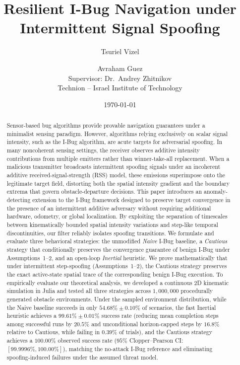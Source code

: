 \documentclass[12pt, a4paper]{article}
\title{Resilient I-Bug Navigation under Intermittent Signal Spoofing}
\author{
  Tsuriel Vizel \and Avraham Guez \\[1ex]
  \small Supervisor: Dr.\ Andrey Zhitnikov \\
  \small Technion -- Israel Institute of Technology
}
\date{\today}
\begin{document}
\maketitle

\begin{abstract}
Sensor-based bug algorithms provide provable navigation guarantees under a minimalist sensing paradigm. However, algorithms relying exclusively on scalar signal intensity, such as the I-Bug algorithm, are acute targets for adversarial spoofing. In many noncoherent sensing settings, the receiver observes additive intensity contributions from multiple emitters rather than winner-take-all replacement. When a malicious transmitter broadcasts intermittent spoofing signals under an incoherent additive received-signal-strength (RSS) model, these emissions superimpose onto the legitimate target field, distorting both the spatial intensity gradient and the boundary extrema that govern obstacle-departure decisions. This paper introduces an anomaly-detecting extension to the I-Bug framework designed to preserve target convergence in the presence of an intermittent additive adversary without requiring additional hardware, odometry, or global localization. By exploiting the separation of timescales between kinematically bounded spatial intensity variations and step-like temporal discontinuities, our filter reliably isolates spoofing transitions. We formulate and evaluate three behavioral strategies: the unmodified \textit{Naive} I-Bug baseline, a \textit{Cautious} strategy that conditionally preserves the convergence guarantee of benign I-Bug under Assumptions~1--2, and an open-loop \textit{Inertial} heuristic. We prove mathematically that under intermittent step-spoofing (Assumptions~1--2), the Cautious strategy preserves the exact active-state spatial trace of the corresponding benign I-Bug execution. To empirically evaluate our theoretical analysis, we developed a continuous 2D kinematic simulation in Julia and tested all three strategies across $1,000,000$ procedurally generated obstacle environments. Under the sampled environment distribution, while the Naive baseline succeeds in only $54.68\% \pm 0.10\%$ of scenarios, the fast Inertial heuristic achieves a $99.61\% \pm 0.01\%$ success rate (reducing mean completion steps among successful runs by $20.5\%$ and unconditional horizon-capped steps by $16.8\%$ relative to Cautious, while failing in $0.39\%$ of trials), and the Cautious strategy achieves a $100.00\%$ observed success rate ($95\%$ Clopper--Pearson CI: $[99.9996\%, 100.00\%]$), matching the no-attack I-Bug reference and eliminating spoofing-induced failures under the assumed threat model.
\end{abstract}
\end{document}
